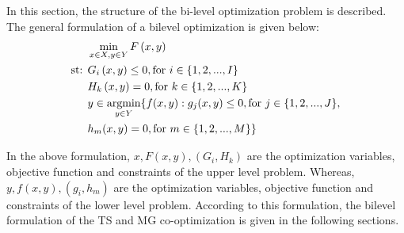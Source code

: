 In this section, the structure of the bi-level optimization problem is described. The general formulation of a bilevel optimization is given below:
\begin{align}
\begin{aligned}
&\operatorname*{min}_{x\in X, y\in Y}F\left(x,y\right) \\
\text{st:   }  & G_i\left(x,y\right)\leq 0, \text{for   }  i \in \{1,2,...,I\}\label{prime}\\
& H_k\left(x,y\right) = 0, \text{for   }  k \in \{1,2,...,K\}\\
& y\in \operatorname*{argmin}_{y\in Y} \{f(x,y): g_j(x,y)\leq 0, \text{for   }  j \in \{1,2,...,J\}, \\ 
                                                   &h_m(x,y) = 0, \text{for   }  m \in \{1,2,...,M\}  \}
\end{aligned}
\end{align}


In the above formulation, $x,F(x,y),(G_i, H_k)$ are the optimization variables, objective function and constraints of the upper level problem. Whereas, $y,f(x,y),(g_i,h_m)$ are the optimization variables, objective function and constraints of the lower level problem. According to this formulation, the bilevel formulation of the TS and MG co-optimization is given in the following sections. 

